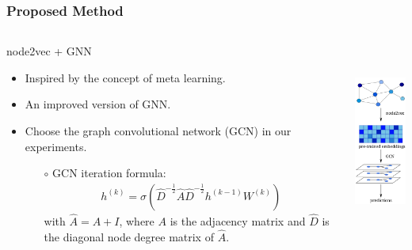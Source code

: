 \documentclass[notes, 10pt, aspectratio=169]{beamer}
\begin{document}
\begin{frame}
    \frametitle{Proposed Method}
    \begin{columns}
        \begin{column}{0.7\textwidth}
            node2vec + GNN
            \begin{itemize}
                \item Inspired by the concept of meta learning.
                \item An improved version of GNN.
                \item Choose the graph convolutional network (GCN) in our experiments.
                    \begin{itemize}
                        \item[$\circ$] GCN iteration formula:
                            \begin{align*}
                                h^{(k)} = \sigma (\hat{D}^{-\frac{1}{2}}\hat{A}\hat{D}^{-\frac{1}{2}}h^{(k-1)}W^{(k)})
                            \end{align*}
                            with $\hat{A} = A + I$, where $A$ is the adjacency matrix and $\hat{D}$ is the diagonal node degree matrix of $\hat{A}$.
            \end{itemize}
    \end{itemize}
        \end{column}
        \begin{column}{0.3\textwidth}
           \begin{center}
               \includegraphics[height=6.5cm]{./graphics/proposed-model.png}
           \end{center} 
        \end{column}
    \end{columns}
\end{frame}
\end{document}

